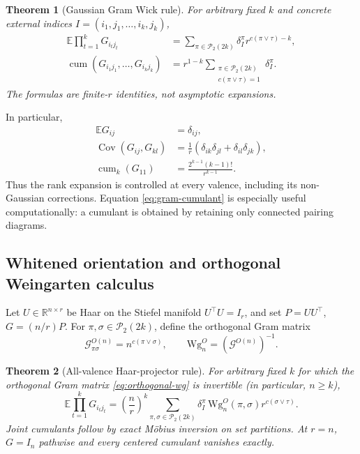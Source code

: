 \documentclass{article}
\newtheorem{theorem}{Theorem}[section]
\newcommand{\E}{\mathbb E}
\newcommand{\R}{\mathbb R}
\newcommand{\cP}{\mathcal P}
\newcommand{\Cov}{\operatorname{Cov}}
\newcommand{\cum}{\operatorname{cum}}
\begin{document}
\begin{theorem}[Gaussian Gram Wick rule]
\label{thm:gram-wick}
For arbitrary fixed \(k\) and concrete external indices
\(I=(i_1,j_1,\ldots,i_k,j_k)\),
\begin{align}
\E\prod_{t=1}^kG_{i_tj_t}
&=\sum_{\pi\in\cP_2(2k)}
\delta_I^\pi r^{c(\pi\vee\tau)-k},
\label{eq:gram-moment}\\
\cum(G_{i_1j_1},\ldots,G_{i_kj_k})
&=r^{1-k}
\sum_{\substack{\pi\in\cP_2(2k)\\c(\pi\vee\tau)=1}}
\delta_I^\pi.
\label{eq:gram-cumulant}
\end{align}
The formulas are finite-\(r\) identities, not asymptotic expansions.
\end{theorem}

In particular,
\begin{align}
\E G_{ij}&=\delta_{ij},\label{eq:gram-mean}\\
\Cov(G_{ij},G_{kl})
&=\frac1r(\delta_{ik}\delta_{jl}+\delta_{il}\delta_{jk}),
\label{eq:gram-cov}\\
\cum_k(G_{11})&=\frac{2^{k-1}(k-1)!}{r^{k-1}}.
\label{eq:gram-diag-cumulant}
\end{align}
Thus the rank expansion is controlled at every valence, including its
non-Gaussian corrections.  Equation \eqref{eq:gram-cumulant} is especially
useful computationally: a cumulant is obtained by retaining only connected
pairing diagrams.

\subsection{Whitened orientation and orthogonal Weingarten calculus}

Let \(U\in\R^{n\times r}\) be Haar on the Stiefel manifold
\(U^\top U=I_r\), and set \(P=UU^\top\), \(G=(n/r)P\).  For
\(\pi,\sigma\in\cP_2(2k)\), define the orthogonal Gram matrix
\begin{equation}
\mathcal G^{O(n)}_{\pi\sigma}=n^{c(\pi\vee\sigma)},
\qquad
\mathrm{Wg}^{O}_n=(\mathcal G^{O(n)})^{-1}.
\label{eq:orthogonal-wg}
\end{equation}

\begin{theorem}[All-valence Haar-projector rule]
\label{thm:projector-weingarten}
For arbitrary fixed \(k\) for which the orthogonal Gram matrix
\eqref{eq:orthogonal-wg} is invertible (in particular, \(n\ge k\)),
\begin{equation}
\E\prod_{t=1}^kG_{i_tj_t}
=\left(\frac nr\right)^k
\sum_{\pi,\sigma\in\cP_2(2k)}
\delta_I^\pi\,\mathrm{Wg}^{O}_n(\pi,\sigma)
r^{c(\sigma\vee\tau)}.
\label{eq:projector-moment}
\end{equation}
Joint cumulants follow by exact M\"obius inversion on set partitions.
At \(r=n\), \(G=I_n\) pathwise and every centered cumulant vanishes exactly.
\end{theorem}
\end{document}

